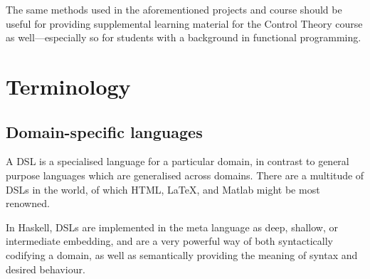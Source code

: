 The same methods used in the aforementioned projects and course should be useful for providing supplemental learning material for the Control Theory course as well---especially so for students with a background in functional programming. 

\section{Terminology}
\subsection{Domain-specific languages} \label{sec:DSLs}
A DSL is a specialised language for a particular domain, in contrast to general purpose languages which are generalised across domains. There are a multitude of DSLs in the world, of which HTML, \LaTeX, and Matlab \cite{mernik_heering_sloane_2005} might be most renowned. 

In Haskell, DSLs are implemented in the meta language as deep, shallow, or intermediate embedding, and are a very powerful way of 
both syntactically codifying a domain, as well as semantically providing the meaning of syntax and desired behaviour.
\iffalse
Anteckningar(Slids):

Vad är ämnet/problemet som ska undersökas? 
Varför har ämnet/problemet uppkommit? 
Varför är det ett relevant eller intressant ämne/problem? 
För vem? 
Kan det specifika ämnet/problemet relateras till en mer generell diskussion?
\fi